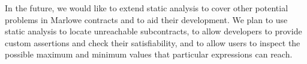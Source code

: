 \documentclass[english,runningheads]{llncs}
\begin{document}
In the future, we would like to extend static analysis to cover other
potential problems in Marlowe contracts and to aid their development.
We plan to use static analysis to locate unreachable
subcontracts, to allow developers to provide custom assertions and
check their satisfiability, and to allow users to inspect the
possible maximum and minimum values that particular expressions can
reach. 




\end{document}
